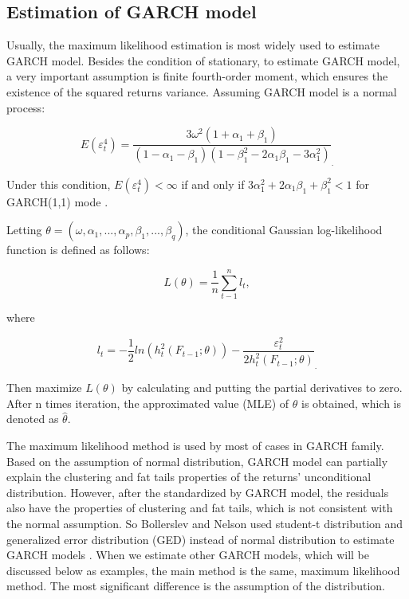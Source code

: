 \subsection{Estimation of GARCH model}

Usually, the maximum likelihood estimation is most widely used to estimate GARCH model. Besides the condition of stationary, to estimate GARCH model, a very important assumption is finite fourth-order moment, which ensures the existence of the squared returns variance. Assuming GARCH model is a normal process:
 
\begin{equation}
E(\varepsilon_t^4)=\frac{3\omega^2(1+\alpha_1+\beta_1)}{(1-\alpha_1-\beta_1)(1-\beta_1^2-2\alpha_1\beta_1-3\alpha_1^2)}_.
\end{equation}

Under this condition, $E(\varepsilon_t^4)<\infty$ if and only if $3\alpha_1^2+2\alpha_1\beta_1+\beta_1^2<1$ for GARCH(1,1) mode \cite{Milhj2012}.  

Letting  $\theta=(\omega, \alpha_1, ..., \alpha_p,\beta_1,..., \beta_q)$, the conditional Gaussian log-likelihood function is defined as follows:

\begin{equation}
 L(\theta) = \frac{1}{n}\sum_{t-1}^nl_t,
\end{equation}

where

\begin{equation}
l_t =-\frac{1}{2}ln(h_t^2(F_{t-1};\theta))-\frac{\varepsilon_t^2}{2h_t^2(F_{t-1};\theta)}_.
\end{equation}

Then maximize $L(\theta)$ by calculating and putting the partial derivatives to zero. After n times iteration, the approximated value (MLE) of $\theta$ is obtained, which is denoted as $\hat{\theta}$.

The maximum likelihood method is used by most of cases in GARCH family. Based on the assumption of normal distribution, GARCH model can partially explain the clustering and fat tails properties of the returns’ unconditional distribution. However, after the standardized by GARCH model, the residuals also have the properties of clustering and fat tails, which is not consistent with the normal assumption. So Bollerslev and Nelson used student-t distribution and generalized error distribution (GED) instead of normal distribution to estimate GARCH models \cite{Bollerslev1986}\cite{Nelson1991}. When we estimate other GARCH models, which will be discussed below as examples, the main method is the same, maximum likelihood method. The most significant difference is the assumption of the distribution. 

